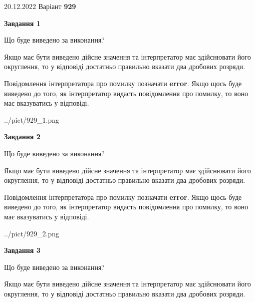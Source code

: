 \documentclass[12pt, ukrainian]{article}
\begin{document}
{20.12.2022 Варіант \No \textbf { 929 }\par}
{
\begin {Large}

{\begin {center}\textbf{Завдання 1}\end {center}}\par
Що буде виведено за виконання? \par

Якщо має бути виведено дійсне значення та інтерпретатор має здійснювати його округлення, 
то у відповіді достатньо правильно вказати два дробових розряди.

Повідомлення інтерпретатора про помилку позначати \textbf{error}.
Якщо щось буде виведено до того, як інтерпретатор видасть повідомлення про помилку, 
то воно має вказуватись у відповіді. \par

\begin{center}
	{../pict/929_1.png}
\end{center}
\newpage

{\begin {center}\textbf{Завдання 2}\end {center}}\par
Що буде виведено за виконання? \par

Якщо має бути виведено дійсне значення та інтерпретатор має здійснювати його округлення, 
то у відповіді достатньо правильно вказати два дробових розряди.

Повідомлення інтерпретатора про помилку позначати \textbf{error}.
Якщо щось буде виведено до того, як інтерпретатор видасть повідомлення про помилку, 
то воно має вказуватись у відповіді. \par

\begin{center}
	{../pict/929_2.png}
\end{center}
\newpage

{\begin {center}\textbf{Завдання 3}\end {center}}\par
Що буде виведено за виконання? \par

Якщо має бути виведено дійсне значення та інтерпретатор має здійснювати його округлення, 
то у відповіді достатньо правильно вказати два дробових розряди.


\end{Large}}
\end{document}
